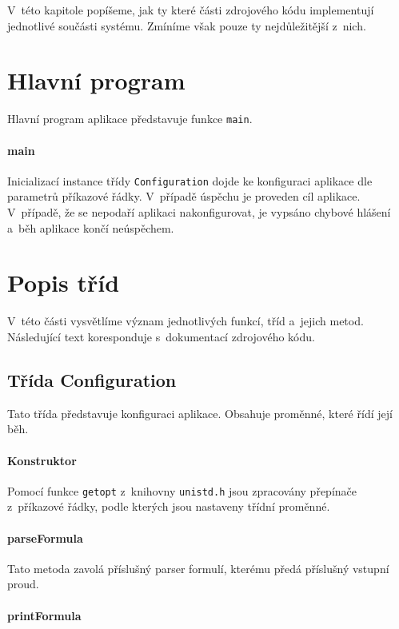\documentclass[thesis=B,czech,hidelinks]{thesis}[2012/06/26]
\begin{document}
V~této kapitole popíšeme, jak ty které části zdrojového kódu implementují jednotlivé součásti systému. Zmíníme však pouze ty nejdůležitější z~nich.

\section{Hlavní program}

Hlavní program aplikace představuje funkce \texttt{main}.

\paragraph{main}

Inicializací instance třídy \texttt{Configuration} dojde ke konfiguraci aplikace dle parametrů příkazové řádky. V~případě úspěchu je proveden cíl aplikace. V~případě, že se nepodaří aplikaci nakonfigurovat, je vypsáno chybové hlášení a~běh aplikace končí neúspěchem.

\section{Popis tříd}

V~této části vysvětlíme význam jednotlivých funkcí, tříd a~jejich metod. Následující text koresponduje s~dokumentací zdrojového kódu.

\subsection{Třída Configuration}

Tato třída představuje konfiguraci aplikace. Obsahuje proměnné, které řídí její běh.

\paragraph{Konstruktor}

Pomocí funkce \texttt{getopt} z~knihovny \texttt{unistd.h} jsou zpracovány přepínače z~příkazové řádky, podle kterých jsou nastaveny třídní proměnné.

\paragraph{parseFormula}

Tato metoda zavolá příslušný parser formulí, kterému předá příslušný vstupní proud.

\paragraph{printFormula}
\end{document}
